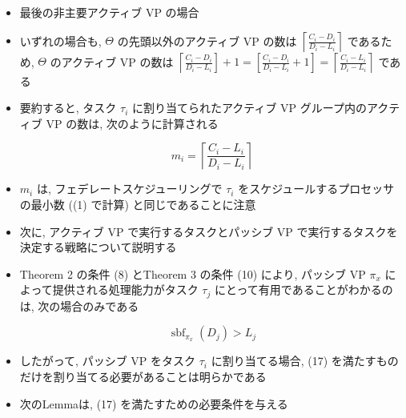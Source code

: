 \begin{frame}{}
    \begin{itemize}
        \item 最後の非主要アクティブ VP の場合
\item いずれの場合も, $\Theta$ の先頭以外のアクティブ VP の数は $\left\lceil\frac{C_{i}-D_{i}}{D_{i}-L_{i}}\right\rceil$ であるため, $\Theta$ のアクティブ VP の数は $\left\lceil\frac{C_{i}-D_{i}}{D_{i}-L_{i}}\right]+1=\left[\frac{C_{i}-D_{i}}{D_{i}-L_{i}}+1\right]=\left\lceil\frac{C_{i}-L_{i}}{D_{i}-L_{i}}\right\rceil$ である
\item 要約すると, タスク $\tau_{i}$ に割り当てられたアクティブ VP グループ内のアクティブ VP の数は, 次のように計算される

              \begin{equation*}
                  m_{i}=\left\lceil\frac{C_{i}-L_{i}}{D_{i}-L_{i}}\right\rceil
              \end{equation*}

        \item $m_{i}$ は, フェデレートスケジューリングで $\tau_{i}$ をスケジュールするプロセッサの最小数 ((1) で計算) と同じであることに注意
    \end{itemize}
\end{frame}

\begin{frame}{}
    \begin{itemize}
        \item 次に, アクティブ VP で実行するタスクとパッシブ VP で実行するタスクを決定する戦略について説明する
\item Theorem 2 の条件 (8) とTheorem 3 の条件 (10) により, パッシブ VP $\pi_{x}$ によって提供される処理能力がタスク $\tau_{j}$ にとって有用であることがわかるのは, 次の場合のみである

              \begin{equation*}
                  \operatorname{sbf}_{\pi_{x}}\left(D_{j}\right)>L_{j}
              \end{equation*}
    \end{itemize}
\end{frame}

\begin{frame}{}
    \begin{itemize}
        \item したがって, パッシブ VP をタスク $\tau_{i}$ に割り当てる場合, (17) を満たすものだけを割り当てる必要があることは明らかである
\item 次のLemmaは, (17) を満たすための必要条件を与える
    \end{itemize}
\end{frame}

